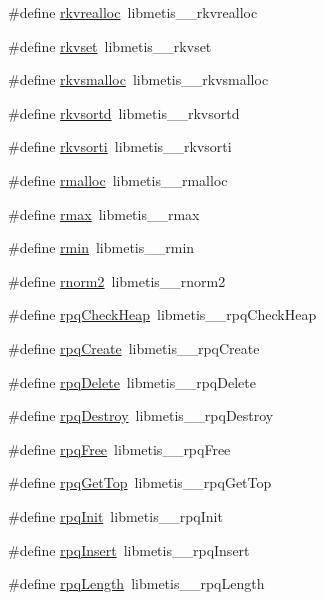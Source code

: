 \begin{DoxyCompactItemize}
\#define \hyperlink{a00212_ad8b6f4036773dc3508eff00d0c72d2a6}{rkvrealloc}~libmetis\+\_\+\+\_\+rkvrealloc
\item 
\#define \hyperlink{a00212_aeb45e9e2858fff7115bcebb4a1215119}{rkvset}~libmetis\+\_\+\+\_\+rkvset
\item 
\#define \hyperlink{a00212_aed308dbb1e798e0e402e08fe2f9217b7}{rkvsmalloc}~libmetis\+\_\+\+\_\+rkvsmalloc
\item 
\#define \hyperlink{a00212_a14b38cb8f468ea51456fce4e2c2b385c}{rkvsortd}~libmetis\+\_\+\+\_\+rkvsortd
\item 
\#define \hyperlink{a00212_ac9859781dc2e75b7f14752de6e016376}{rkvsorti}~libmetis\+\_\+\+\_\+rkvsorti
\item 
\#define \hyperlink{a00212_a6e1bfe39bd009cf559167081df68af5d}{rmalloc}~libmetis\+\_\+\+\_\+rmalloc
\item 
\#define \hyperlink{a00212_a3b40e49367d7e2ef1a06b2e8adde1bd1}{rmax}~libmetis\+\_\+\+\_\+rmax
\item 
\#define \hyperlink{a00212_a77eef7282466a404036d38a35cdaade9}{rmin}~libmetis\+\_\+\+\_\+rmin
\item 
\#define \hyperlink{a00212_a4bd92867f9248e29cc783f1aed780e3b}{rnorm2}~libmetis\+\_\+\+\_\+rnorm2
\item 
\#define \hyperlink{a00212_a219f442de54c5ed378f9c5d4da9f52c4}{rpq\+Check\+Heap}~libmetis\+\_\+\+\_\+rpq\+Check\+Heap
\item 
\#define \hyperlink{a00212_a2d7a2ad1986f6aeebab9871efc06fac3}{rpq\+Create}~libmetis\+\_\+\+\_\+rpq\+Create
\item 
\#define \hyperlink{a00212_ac2224a18048011cd07f7e8b1fb3b82a6}{rpq\+Delete}~libmetis\+\_\+\+\_\+rpq\+Delete
\item 
\#define \hyperlink{a00212_a45cf8a62f87ceb8d0937aac416a485f6}{rpq\+Destroy}~libmetis\+\_\+\+\_\+rpq\+Destroy
\item 
\#define \hyperlink{a00212_a2d754bd87243f23640da1da57d8e1c41}{rpq\+Free}~libmetis\+\_\+\+\_\+rpq\+Free
\item 
\#define \hyperlink{a00212_a6c5ce6d60a9a4cd0221f924ad5a464c8}{rpq\+Get\+Top}~libmetis\+\_\+\+\_\+rpq\+Get\+Top
\item 
\#define \hyperlink{a00212_a2176d304dcce318d7c8c14e05f6b1ccd}{rpq\+Init}~libmetis\+\_\+\+\_\+rpq\+Init
\item 
\#define \hyperlink{a00212_aed1c6dd79fe7625ea71a4a320a5e3bf5}{rpq\+Insert}~libmetis\+\_\+\+\_\+rpq\+Insert
\item 
\#define \hyperlink{a00212_ad811af8aff2c6ecbd99c17373c1dc7c5}{rpq\+Length}~libmetis\+\_\+\+\_\+rpq\+Length

\end{DoxyCompactItemize}
